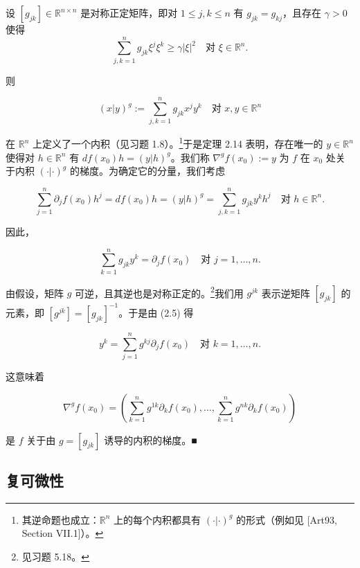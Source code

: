 \begin{remark}
\begin{items}
\proofhead
设 $ [g_{jk}] \in \mathbb{R}^{n \times n} $ 是对称正定矩阵，即对 $ 1 \le j, k \le n $ 有 $ g_{jk} = g_{kj} $，且存在 $ \gamma > 0 $ 使得
\[
\sum_{j,k=1}^{n} g_{jk} \xi^j \xi^k \ge \gamma |\xi|^2 \quad \text{对 } \xi \in \mathbb{R}^n .
\]

则

\[
(x|y)^g := \sum_{j,k=1}^{n} g_{jk} x^j y^k \quad \text{对 } x, y \in \mathbb{R}^n
\]

在 $ \mathbb{R}^n $ 上定义了一个内积（见习题 1.8）。\footnote{其逆命题也成立：$ \mathbb{R}^n $ 上的每个内积都具有 $ (\cdot|\cdot)^g $ 的形式（例如见 [Art93, Section VII.1]）。}于是定理 2.14 表明，存在唯一的 $ y \in \mathbb{R}^n $ 使得对 $ h \in \mathbb{R}^n $ 有 $ df(x_0)h = (y|h)^g $。我们称 $ \nabla^g f(x_0) := y $ 为 $ f $ 在 $ x_0 $ 处关于内积 $ (\cdot|\cdot)^g $ 的梯度。为确定它的分量，我们考虑

\[
\sum_{j=1}^{n} \partial_j f(x_0) h^j = df(x_0)h = (y|h)^g = \sum_{j,k=1}^{n} g_{jk} y^k h^j \quad \text{对 } h \in \mathbb{R}^n .
\]

因此，

\begin{equation}
\sum_{k=1}^{n} g_{jk} y^k = \partial_j f(x_0) \quad \text{对 } j = 1, \ldots, n .\tag{2.5}
\end{equation}

由假设，矩阵 $ g $ 可逆，且其逆也是对称正定的。\footnote{见习题 5.18。}我们用 $ g^{jk} $ 表示逆矩阵 $ [g_{jk}] $ 的元素，即 $ [g^{jk}] = [g_{jk}]^{-1} $。于是由 (2.5) 得

\[
y^k = \sum_{j=1}^{n} g^{kj} \partial_j f(x_0) \quad \text{对 } k = 1, \ldots, n .
\]

这意味着

\begin{equation}
\nabla^g f(x_0) = \left( \sum_{k=1}^{n} g^{1k} \partial_k f(x_0), \ldots, \sum_{k=1}^{n} g^{nk} \partial_k f(x_0) \right)\tag{2.6}
\end{equation}

是 $ f $ 关于由 $ g = [g_{jk}] $ 诱导的内积的梯度。\nobreak\hspace{0.35em}■

\end{items}

\end{remark}

\subsection*{复可微性}

